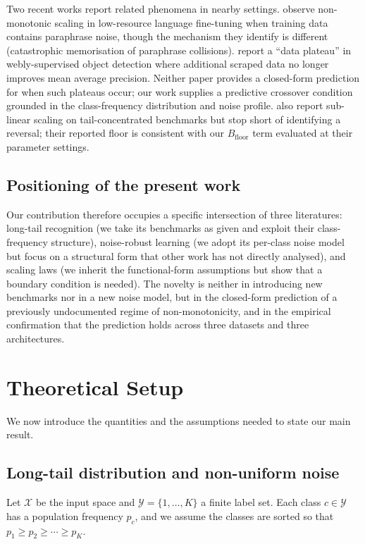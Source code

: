 \documentclass[11pt]{article}
\begin{document}
Two recent works report related phenomena in nearby settings. \citet{hassani2024} observe non-monotonic scaling in low-resource language fine-tuning when training data contains paraphrase noise, though the mechanism they identify is different (catastrophic memorisation of paraphrase collisions). \citet{bjornstad2024} report a ``data plateau'' in webly-supervised object detection where additional scraped data no longer improves mean average precision. Neither paper provides a closed-form prediction for when such plateaus occur; our work supplies a predictive crossover condition grounded in the class-frequency distribution and noise profile. \citet{lin2023scaling} also report sub-linear scaling on tail-concentrated benchmarks but stop short of identifying a reversal; their reported floor is consistent with our $B_{\mathrm{floor}}$ term evaluated at their parameter settings.

\subsection{Positioning of the present work}

Our contribution therefore occupies a specific intersection of three literatures: long-tail recognition (we take its benchmarks as given and exploit their class-frequency structure), noise-robust learning (we adopt its per-class noise model but focus on a structural form that other work has not directly analysed), and scaling laws (we inherit the functional-form assumptions but show that a boundary condition is needed). The novelty is neither in introducing new benchmarks nor in a new noise model, but in the closed-form prediction of a previously undocumented regime of non-monotonicity, and in the empirical confirmation that the prediction holds across three datasets and three architectures.

\section{Theoretical Setup} \label{sec:theory}

We now introduce the quantities and the assumptions needed to state our main result.

\subsection{Long-tail distribution and non-uniform noise}

Let $\mathcal{X}$ be the input space and $\mathcal{Y} = \{1, \ldots, K\}$ a finite label set. Each class $c \in \mathcal{Y}$ has a population frequency $p_c$, and we assume the classes are sorted so that $p_1 \ge p_2 \ge \cdots \ge p_K$.
\end{document}
